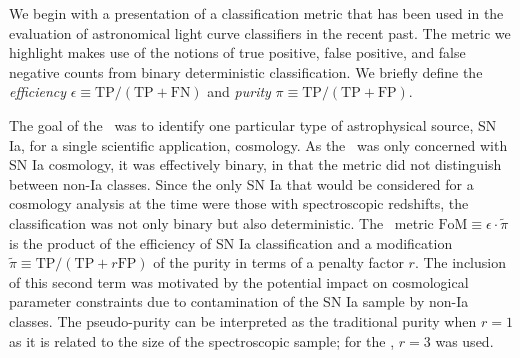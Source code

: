 We begin with a presentation of a classification metric that has been used in the evaluation of astronomical light curve classifiers in the recent past.
The metric we highlight makes use of the notions of true positive, false positive, and false negative counts from binary deterministic classification.
We briefly define the \textit{efficiency} $\epsilon \equiv \mathrm{TP} / (\mathrm{TP} + \mathrm{FN})$ and \textit{purity} $\pi \equiv \mathrm{TP} / (\mathrm{TP} + \mathrm{FP})$.


The goal of the \snphotcc\ was to identify one particular type of astrophysical source, SN Ia, for a single scientific application, cosmology.
As the \snphotcc\ was only concerned with SN Ia cosmology, it was effectively binary, in that the metric did not distinguish between non-Ia classes.
Since the only SN Ia that would be considered for a cosmology analysis at the time were those with spectroscopic redshifts, the classification was not only binary but also deterministic.
The \snphotcc\ metric $\mathrm{FoM} \equiv \epsilon \cdot \tilde{\pi}$ is the product of the efficiency of SN Ia classification and a modification $\tilde{\pi} \equiv \mathrm{TP} / (\mathrm{TP} + r \mathrm{FP})$ of the purity in terms of a penalty factor $r$.
The inclusion of this second term was motivated by the potential impact on cosmological parameter constraints due to contamination of the SN Ia sample by non-Ia classes.
The pseudo-purity can be interpreted as the traditional purity when $r = 1$ as it is related to the size of the spectroscopic sample; for the \snphotcc, $r=3$ was used.



